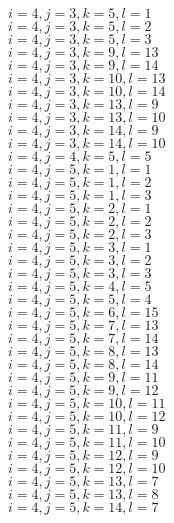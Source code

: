 \documentclass[14pt]{article}
\begin{document}
    $i=4,j=3,k=5,l=1 $ \\ 
    $i=4,j=3,k=5,l=2 $ \\ 
    $i=4,j=3,k=5,l=3 $ \\ 
    $i=4,j=3,k=9,l=13 $ \\ 
    $i=4,j=3,k=9,l=14 $ \\ 
    $i=4,j=3,k=10,l=13 $ \\ 
    $i=4,j=3,k=10,l=14 $ \\ 
    $i=4,j=3,k=13,l=9 $ \\ 
    $i=4,j=3,k=13,l=10 $ \\ 
    $i=4,j=3,k=14,l=9 $ \\ 
    $i=4,j=3,k=14,l=10 $ \\ 
    $i=4,j=4,k=5,l=5 $ \\ 
    $i=4,j=5,k=1,l=1 $ \\ 
    $i=4,j=5,k=1,l=2 $ \\ 
    $i=4,j=5,k=1,l=3 $ \\ 
    $i=4,j=5,k=2,l=1 $ \\ 
    $i=4,j=5,k=2,l=2 $ \\ 
    $i=4,j=5,k=2,l=3 $ \\ 
    $i=4,j=5,k=3,l=1 $ \\ 
    $i=4,j=5,k=3,l=2 $ \\ 
    $i=4,j=5,k=3,l=3 $ \\ 
    $i=4,j=5,k=4,l=5 $ \\ 
    $i=4,j=5,k=5,l=4 $ \\ 
    $i=4,j=5,k=6,l=15 $ \\ 
    $i=4,j=5,k=7,l=13 $ \\ 
    $i=4,j=5,k=7,l=14 $ \\ 
    $i=4,j=5,k=8,l=13 $ \\ 
    $i=4,j=5,k=8,l=14 $ \\ 
    $i=4,j=5,k=9,l=11 $ \\ 
    $i=4,j=5,k=9,l=12 $ \\ 
    $i=4,j=5,k=10,l=11 $ \\ 
    $i=4,j=5,k=10,l=12 $ \\ 
    $i=4,j=5,k=11,l=9 $ \\ 
    $i=4,j=5,k=11,l=10 $ \\ 
    $i=4,j=5,k=12,l=9 $ \\ 
    $i=4,j=5,k=12,l=10 $ \\ 
    $i=4,j=5,k=13,l=7 $ \\ 
    $i=4,j=5,k=13,l=8 $ \\ 
    $i=4,j=5,k=14,l=7 $ \\ 
\end{document}
